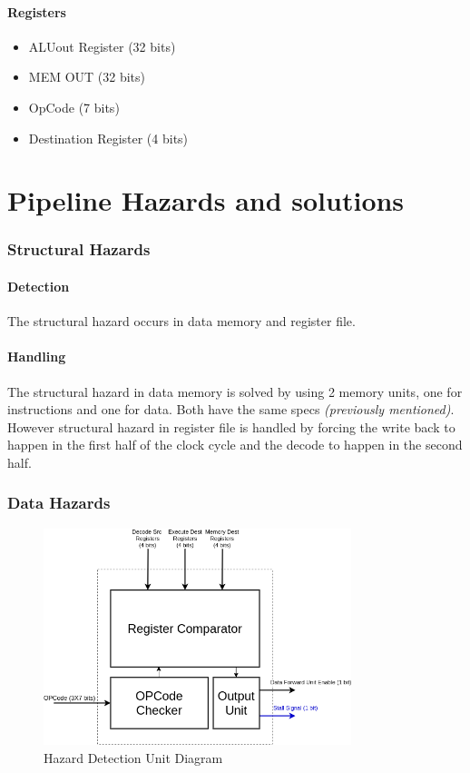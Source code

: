 \documentclass[12pt]{report}
\begin{document}
\subsection{Registers}
\begin{itemize}
    \item ALUout Register (32 bits)
    \item MEM OUT (32 bits)
    \item OpCode (7 bits)
    \item Destination Register (4 bits)
\end{itemize}

\part{Pipeline Hazards and solutions}

\section{Structural Hazards}

\subsection{Detection}
The structural hazard occurs in data memory and register file.

\subsection{Handling}
The structural hazard in data memory is solved by using 2 memory units, one for instructions and one for data. Both have the same specs \emph{(previously mentioned)}. \\
However structural hazard in register file is handled by forcing the write back to happen in the first half of the clock cycle and the decode to happen in the second half.

\section{Data Hazards}
\begin{center}
    \begin{figure}[hp]
        \centering
        \includegraphics[width=0.8\textwidth]{hdu}
        \caption{Hazard Detection Unit Diagram}
        \label{fig:hdu}
    \end{figure}
\end{center}
\end{document}
